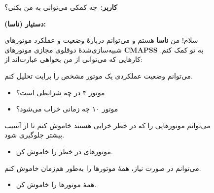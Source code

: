 \begin{figure}[h]
	\centering
	\begin{minipage}{0.92\textwidth}
		
		\begin{userBox}
			\textbf{کاربر:}\ چه کمکی می‌توانی به من بکنی؟
		\end{userBox}
		
		\begin{botBox}
			\textbf{دستیار (ناسا):}
			
			سلام! من \textbf{ناسا} هستم و می‌توانم دربارهٔ وضعیت و عملکرد موتورهای
			شبیه‌سازی‌شدهٔ دوقلوی مجازی موتورهای \textbf{CMAPSS} به تو کمک کنم.
			کارهایی که می‌توانی از من بخواهی عبارت‌اند از:
			
			\medskip
			
			
			می‌توانم وضعیت عملکردی یک موتور مشخص را برایت تحلیل کنم.
			
			\exLabel
			\begin{itemize}[rightmargin=1.5em, topsep=2pt, itemsep=1pt]
				\item موتور ۴ در چه شرایطی است؟
				\item موتور ۱۰ چه زمانی خراب می‌شود؟
			\end{itemize}
			
			\medskip
			
			می‌توانم موتورهایی را که در خطر خرابی هستند خاموش کنم تا از آسیب بیشتر جلوگیری شود.
			
			\exLabel
			\begin{itemize}[rightmargin=1.5em, topsep=2pt, itemsep=1pt]
				\item موتورهای در خطر را خاموش کن.
			\end{itemize}
			
			\medskip
			
			می‌توانم در صورت نیاز، همهٔ موتورها را به‌طور هم‌زمان خاموش کنم.
			
			\exLabel
			\begin{itemize}[rightmargin=1.5em, topsep=2pt, itemsep=1pt]
				\item همهٔ موتورها را خاموش کن.
			\end{itemize}
			
			\medskip
			

\end{botBox}
\end{minipage}
\end{figure}
